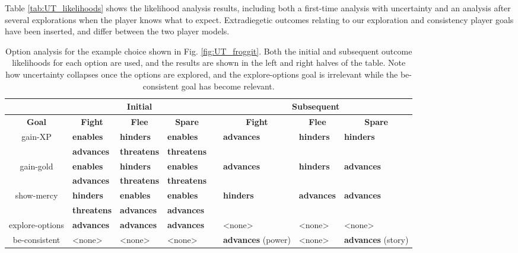 \documentclass[arts,article,submit,moreauthors,pdftex,10pt,a4paper]{Definitions/mdpi}
\newcommand{\enables}{\textbf{\color{enables}enables}}
\newcommand{\advances}{\textbf{\color{advances}advances}}
\newcommand{\threatens}{\textbf{\color{threatens}threatens}}
\newcommand{\hinders}{\textbf{\color{hinders}hinders}}
\begin{document}
Table \ref{tab:UT_likelihoods} shows the likelihood analysis results, including both a first-time analysis with uncertainty and an analysis after several explorations when the player knows what to expect.
%
Extradiegetic outcomes relating to our exploration and consistency player goals have been inserted, and differ between the two player models.


\begin{table}[H]
\centering
\begin{tabular}{c l l l c l l l}
  \toprule
  & \multicolumn{3}{c}{\textbf{Initial}} && \multicolumn{3}{c}{\textbf{Subsequent}} \\
  \midrule
  \textbf{Goal} & \multicolumn{1}{c}{\textbf{Fight}} & \multicolumn{1}{c}{\textbf{Flee}} & \multicolumn{1}{c}{\textbf{Spare}} && \multicolumn{1}{c}{\textbf{Fight}} & \multicolumn{1}{c}{\textbf{Flee}} & \multicolumn{1}{c}{\textbf{Spare}} \\
  \midrule
  \multirow{2}{7em}{\centering gain-XP} & \enables{} & \hinders{} & \enables{} && \multirow{2}{4.5em}{\advances{}} & \multirow{2}{4.5em}{\hinders{}} & \multirow{2}{4.5em}{\hinders{}} \\
                                        & \advances{} & \threatens{} & \threatens{} && & & \\
  \midrule
  \multirow{2}{7em}{\centering gain-gold} & \enables{} & \hinders{} & \enables{} && \multirow{2}{4.5em}{\advances{}} & \multirow{2}{4.5em}{\hinders{}} & \multirow{2}{4.5em}{\advances{}} \\
                                          & \advances{} & \threatens{} & \threatens{} && & & \\
  \midrule
  \multirow{2}{7em}{\centering show-mercy} & \hinders{} & \enables{} & \enables{} && \multirow{2}{4.5em}{\hinders{}} & \multirow{2}{4.5em}{\advances{}} & \multirow{2}{4.5em}{\advances{}} \\
                                          & \threatens{} & \advances{} & \advances{} \\
  \midrule
  explore-options & \advances{} & \advances{} & \advances{} && <none> & <none> & <none> \\
  \midrule
  be-consistent & <none> & <none> & <none> && \advances{} (power) & <none> & \advances{} (story) \\
  \midrule
  \bottomrule
\end{tabular}
\caption[\emph{Undertale}option analysis]{Option analysis for the example choice shown in Fig. \ref{fig:UT_froggit}. Both the initial and subsequent outcome likelihoods for each option are used, and the results are shown in the left and right halves of the table. Note how uncertainty collapses once the options are explored, and the explore-options goal is irrelevant while the be-consistent goal has become relevant.}
\label{tab:UT_options}
\end{table}
\end{document}

